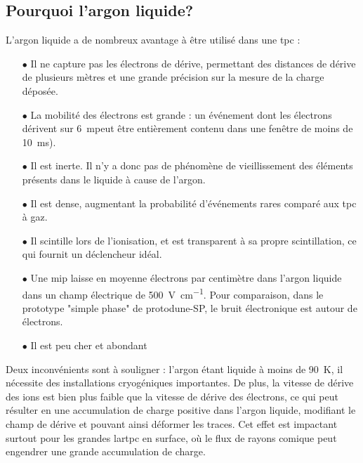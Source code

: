     \subsection{Pourquoi l'argon liquide?}
      L'argon liquide a de nombreux avantage à être utilisé dans une \gls{tpc}\cite{Rubbia1977} :
      \begin{itemize}
        \item[$\bullet$] Il ne capture pas les électrons de dérive, permettant des distances de dérive de plusieurs mètres et une grande précision sur la mesure de la charge déposée.
        \item[$\bullet$] La mobilité des électrons est grande : un événement dont les électrons dérivent sur \SI{6}{\meter}peut être entièrement contenu dans une fenêtre de moins de \SI{10}{\milli\second}).
        \item[$\bullet$] Il est inerte. Il n'y a donc pas de phénomène de vieillissement des éléments présents dans le liquide à cause de l'argon.
        \item[$\bullet$] Il est dense, augmentant la probabilité d'événements rares comparé aux \gls{tpc} à gaz.
        \item[$\bullet$] Il scintille lors de l'ionisation, et est transparent à sa propre scintillation, ce qui fournit un déclencheur idéal.
        \item[$\bullet$] Une \gls{mip} laisse en moyenne  électrons par centimètre dans l'argon liquide dans un champ électrique de \SI{500}{\volt\per\centi\meter}. Pour comparaison, dans le prototype "simple phase" de proto\gls{dune}-SP, le bruit électronique est autour de  électrons.
        \item[$\bullet$] Il est peu cher et abondant
      \end{itemize}
      Deux inconvénients sont à souligner : l'argon étant liquide à moins de \SI{90}{\kelvin}, il nécessite des installations cryogéniques importantes. De plus, la vitesse de dérive des ions est bien plus faible que la vitesse de dérive des électrons, ce qui peut résulter en une accumulation de charge positive dans l'argon liquide, modifiant le champ de dérive et pouvant ainsi déformer les traces. Cet effet est impactant surtout pour les grandes \gls{lartpc} en surface, où le flux de rayons comique peut engendrer une grande accumulation de charge.
